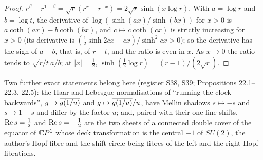 \begin{proof}
$r^\beta-r^{1-\beta}=\sqrt r(r^x-r^{-x})=2\sqrt r\sinh(x\log r)$. With $a=\log r$ and $b=\log t$, the derivative of $\log(\sinh(ax)/\sinh(bx))$ for $x>0$ is $a\coth(ax)-b\coth(bx)$, and $c\mapsto c\coth(cx)$ is strictly increasing for $x>0$ (its derivative is $(\tfrac12\sinh2cx-cx)/\sinh^2cx>0$); so the derivative has the sign of $a-b$, that is, of $r-t$, and the ratio is even in $x$. As $x\to0$ the ratio tends to $\sqrt{r/t}\,a/b$; at $|x|=\tfrac12$, $\sinh(\tfrac12\log r)=(r-1)/(2\sqrt r)$.
\end{proof}

Two further exact statements belong here (register S38, S39;  Propositions 22.1--22.3, 22.5): the Haar and Lebesgue normalisations of ``running the clock backwards'', $g\mapsto\overline{g(1/u)}$ and $g\mapsto\overline{g(1/u)}/u$, have Mellin shadows $s\mapsto-\bar s$ and $s\mapsto1-\bar s$ and differ by the factor $u$; and, paired with their one-line shifts, $\operatorname{Re} s=\tfrac12$ and $\operatorname{Re} s=-\tfrac12$ are the two sheets of a connected double cover of the equator of $\mathbb{C} P^1$ whose deck transformation is the central $-1$ of $SU(2)$, the author's Hopf fibre and the shift circle being fibres of the left and the right Hopf fibrations.
